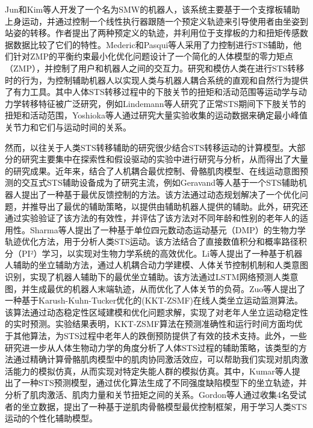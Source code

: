 Jun和Kim等人\cite{hong-guljunWalkingSittostandSupport2011,inhokimKinematicAnalysisSittostand2011}开发了一个名为SMW的机器人，该系统主要基于一个支撑板辅助上身运动，并通过控制一个线性执行器跟随一个预定义轨迹来引导使用者由坐姿到站姿的转移。作者提出了两种预定义的轨迹，并利用位于支撑板的力和扭矩传感数据数据比较了它们的特性。Mederic和Pasqui等人\cite{medericElderlyPeopleSit2006}采用了力控制进行STS辅助，他们针对ZMP的平衡约束最小化优化问题设计了一个简化的人体模型的零力矩点（ZMP），并控制了用户和机器人之间的交互力。研究和模仿人类在进行STS转移时的行为，为控制辅助机器人以实现人类与机器人耦合系统的直观和自然行为提供了有力工具。其中人体STS转移过程中的下肢关节的扭矩和活动范围等运动学与动力学转移特征被广泛研究，例如Lindemann等人\cite{galliQuantitativeAnalysisSit2008}研究了正常STS期间下下肢关节的扭矩和活动范围，Yoshioka等人\cite{yoshiokaBiomechanicalAnalysisRelation2009}通过研究大量实验收集的运动数据来确定最小峰值关节力和它们与运动时间的关系。

然而，以往关于人类STS转移辅助的研究很少结合STS转移运动的计算模型。大部分的研究主要集中在探索性和假设驱动的实验中进行研究与分析，从而得出了大量的研究成果。近年来，结合了人机耦合最优控制、骨骼肌肉模型、在线运动意图预测的交互式STS辅助设备成为了研究主流，例如Geravand等人\cite{geravandHumanSittostandTransfer2017}基于一个STS辅助机器人提出了一种基于最优反馈控制的方法。该方法通过动态规划解决了一个优化问题，并推导出了最优的辅助策略，以提供由辅助机器人提供的辅助。此外，研究还通过实验验证了该方法的有效性，并评估了该方法对不同年龄和性别的老年人的适用性。Sharma等人\cite{sharmaBiomechanicalTrajectoryOptimization2022,sharmaPhysicalHumanRobotInteraction2022}提出了一种基于单位四元数动态运动基元（DMP）的生物力学轨迹优化方法，用于分析人类STS运动。该方法结合了直接数值积分和概率路径积分（PI²）学习，以实现对生物力学系统的高效优化。Li等人\cite{liIntegratedApproachRobotic2021,liHumanCenteredControlFramework2018}提出了一种基于机器人辅助的坐立辅助方法，通过人机耦合动力学建模、人体关节控制机制和人类意图识别，实现了机器人辅助下的最优坐立辅助。该方法通过LSTM网络预测人类意图，并生成最优的机器人末端轨迹，从而优化了人体关节的负荷。Zuo等人\cite{zuoOnlineMonitoringHuman2023}提出了一种基于Karush-Kuhn-Tucker优化的(KKT-ZSMF)在线人类坐立运动监测算法。该算法通过动态稳定性区域建模和优化问题求解，实现了对老年人坐立运动稳定性的实时预测。实验结果表明，KKT-ZSMF算法在预测准确性和运行时间方面均优于其他算法，为STS过程中老年人的跌倒预防提供了有效的技术支持。此外，一些研究进一步从人体生物动力学的角度分析了人体STS过程的辅助策略，该类型的方法通过精确计算骨骼肌肉模型中的肌肉协同激活效应，可以帮助我们实现对肌肉激活能力的模拟仿真，从而实现对特定失能人群的模拟仿真。其中，Kumar等人\cite{kumarPredictingSittoStandAdaptations2022}提出了一种STS预测模型，通过优化算法生成了不同强度缺陷模型下的坐立轨迹，并分析了肌肉激活、肌肉力量和关节扭矩之间的关系。Gordon等人\cite{gordonLearningPersonalisedHuman2023a}通过收集4名受试者的坐立数据，提出了一种基于逆肌肉骨骼模型最优控制框架，用于学习人类STS运动的个性化辅助模型。

